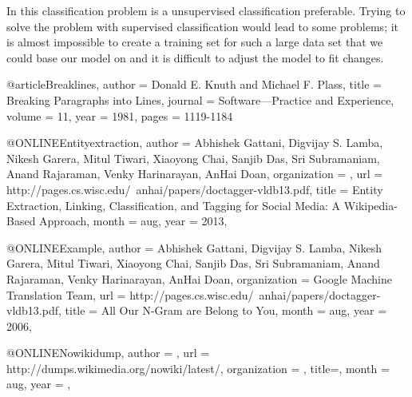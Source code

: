 In this classification problem is a unsupervised classification preferable. Trying to solve the problem with supervised classification would lead to some problems; it is almost impossible to create a training set for such a large data set that we could base our model on and it is difficult to adjust the model to fit changes. 




@article{Breaklines,
author = {Donald E. Knuth and Michael F. Plass},
title = {Breaking Paragraphs into Lines},
journal = {Software---Practice and Experience},
volume = 11,
year = 1981,
pages = {1119-1184}
}

@ONLINE{Entityextraction,
    author = {Abhishek Gattani, Digvijay S. Lamba, Nikesh Garera, Mitul Tiwari, Xiaoyong Chai, Sanjib Das,  Sri Subramaniam,  Anand Rajaraman, Venky Harinarayan, AnHai Doan},
    organization = {},
    url = {http://pages.cs.wisc.edu/~anhai/papers/doctagger-vldb13.pdf},
    title = {Entity Extraction, Linking, Classification, and Tagging for Social Media: A Wikipedia-Based Approach},
    month = aug,
    year = {2013},
}

@ONLINE{Example,
    author = {Abhishek Gattani, Digvijay S. Lamba, Nikesh Garera, Mitul Tiwari, Xiaoyong Chai, Sanjib Das,  Sri Subramaniam,  Anand Rajaraman, Venky Harinarayan, AnHai Doan},
    organization = {Google Machine Translation Team},
    url = {http://pages.cs.wisc.edu/~anhai/papers/doctagger-vldb13.pdf},
    title = {All Our N-Gram are Belong to You},
    month = aug,
    year = {2006},
}

@ONLINE{Nowikidump, 
    author = {},
    url = {http://dumps.wikimedia.org/nowiki/latest/},
    organization = {},
    title={},
    month = aug,
    year = {},
}

